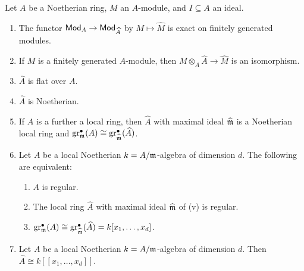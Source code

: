 \begin{proposition}\label{prop: completions of rings}
    Let $A$ be a Noetherian ring, $M$ an $A$-module, and $I\subseteq A$ an ideal. 
    \begin{enumerate}[label=(\roman*)]
        \item The functor $\mathsf{Mod}_{A}\to\mathsf{Mod}_{\widehat{A}}$ by $M\mapsto \widehat{M}$ is exact on finitely generated modules. 
        \item If $M$ is a finitely generated $A$-module, then $M\otimes_{A}\widehat{A}\to\widehat{M}$ is an isomorphism. 
        \item $\widehat{A}$ is flat over $A$. 
        \item $\widehat{A}$ is Noetherian. 
        \item If $A$ is a further a local ring, then $\widehat{A}$ with maximal ideal $\widehat{\mathfrak{m}}$ is a Noetherian local ring and $\mathrm{gr}_{\mathfrak{m}}^{\bullet}(A)\cong\mathrm{gr}_{\widehat{\mathfrak{m}}}^{\bullet}(\widehat{A})$. 
        \item Let $A$ be a local Noetherian $k=A/\mathfrak{m}$-algebra of dimension $d$. The following are equivalent: 
        \begin{enumerate}[label=(\alph*)]
            \item $A$ is regular. 
            \item The local ring $\widehat{A}$ with maximal ideal $\widehat{\mathfrak{m}}$ of (v) is regular. 
            \item $\mathrm{gr}_{\mathfrak{m}}^{\bullet}(A)\cong\mathrm{gr}_{\widehat{\mathfrak{m}}}^{\bullet}(\widehat{A})=k[x_{1},\dots,x_{d}]$. 
        \end{enumerate}
        \item Let $A$ be a local Noetherian $k=A/\mathfrak{m}$-algebra of dimension $d$. Then $\widehat{A}\cong k[[x_{1},\dots,x_{d}]]$. 
    \end{enumerate}
\end{proposition}
